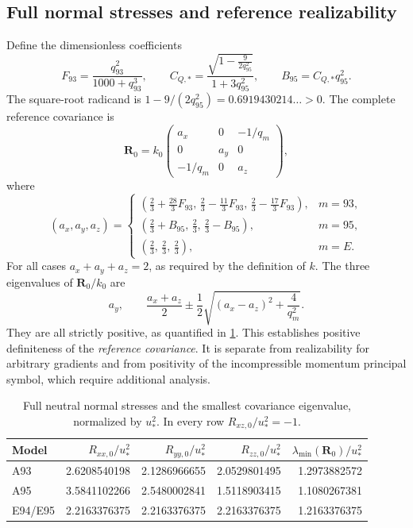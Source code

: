 \documentclass[11pt,a4paper]{article}
\numberwithin{equation}{section}
\newcommand{\ust}{u_*}
\newcommand{\R}{\boldsymbol R}
\begin{document}
\subsection{Full normal stresses and reference realizability}
\label{out:covariance}

Define the dimensionless coefficients
\begin{equation}
 F_{93}=\frac{q_{93}^2}{1000+q_{93}^3},\qquad
 C_{Q,*}=\frac{\sqrt{1-\frac{9}{2q_{95}^2}}}{1+3q_{95}^2},\qquad
 B_{95}=C_{Q,*}q_{95}^2.
 \label{out:normalcoeffs}
\end{equation}
The square-root radicand is
$1-9/(2q_{95}^2)=0.6919430214\ldots>0$.
The complete reference covariance is
\begin{equation}
 \boxed{
 \R_0=k_0
 \begin{pmatrix}
 a_x&0&-1/q_m\\
 0&a_y&0\\
 -1/q_m&0&a_z
 \end{pmatrix},}
 \label{out:R0}
\end{equation}
where
\begin{equation}
 (a_x,a_y,a_z)=
 \begin{cases}
 (\frac23+\frac{28}3F_{93},\,
  \frac23-\frac{11}3F_{93},\,
  \frac23-\frac{17}3F_{93}),&m=93,\\[3pt]
 (\frac23+B_{95},\,\frac23,\,\frac23-B_{95}),&m=95,\\[3pt]
 (\frac23,\,\frac23,\,\frac23),&m=E.
 \end{cases}
 \label{out:normalcomponents}
\end{equation}
For all cases $a_x+a_y+a_z=2$, as required by the definition of $k$.
The three eigenvalues of $\R_0/k_0$ are
\begin{equation}
 a_y,\qquad
 \frac{a_x+a_z}{2}\pm
 \frac12\sqrt{(a_x-a_z)^2+\frac4{q_m^2}}.
 \label{out:referenceeigenvalues}
\end{equation}
They are all strictly positive, as quantified in
\cref{out:normalstable}. This establishes positive definiteness of the
\emph{reference covariance}. It is separate from realizability for
arbitrary gradients and from positivity of the incompressible momentum
principal symbol, which require additional analysis.

\begin{table}[htbp]
\centering\small
\caption{Full neutral normal stresses and the smallest covariance
eigenvalue, normalized by $\ust^2$. In every row
$R_{xz,0}/\ust^2=-1$.}
\label{out:normalstable}
\begin{tabular}{lrrrr}
\toprule
Model & $R_{xx,0}/\ust^2$ & $R_{yy,0}/\ust^2$
& $R_{zz,0}/\ust^2$ & $\lambda_{\min}(\R_0)/\ust^2$\\
\midrule
A93 & 2.6208540198 & 2.1286966655 & 2.0529801495 & 1.2973882572\\
A95 & 3.5841102266 & 2.5480002841 & 1.5118903415 & 1.1080267381\\
E94/E95 & 2.2163376375 & 2.2163376375 & 2.2163376375 & 1.2163376375\\
\bottomrule
\end{tabular}
\end{table}
\end{document}

